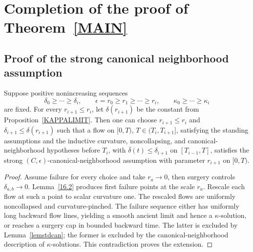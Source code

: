 \chapter{Completion of the proof of Theorem~{\ref{MAIN}}}

\section{Proof of the strong canonical neighborhood assumption}
\label{sectcannbhd}

\begin{proposition}
\label{prop:canonical-neighborhood-extends}

\label{extend}
Suppose positive nonincreasing sequences
\[
  \delta_0\geq\cdots\geq\delta_i,
  \qquad
  \epsilon=r_0\geq r_1\geq\cdots\geq r_i,
  \qquad
  \kappa_0\geq\cdots\geq\kappa_i
\]
are fixed. For every $r_{i+1}\leq r_i$, let $\delta(r_{i+1})$ be the constant
from Proposition~\ref{KAPPALIMIT}. Then one can choose
$r_{i+1}\leq r_i$ and $\delta_{i+1}\leq\delta(r_{i+1})$ such that a flow on
$[0,T)$, $T\in(T_i,T_{i+1}]$, satisfying the standing assumptions and the
inductive curvature, noncollapsing, and canonical-neighborhood hypotheses before
$T_i$, with $\overline\delta(t)\leq\delta_{i+1}$ on
$[T_{i-1},T]$, satisfies the strong $(C,\epsilon)$-canonical-neighborhood
assumption with parameter $r_{i+1}$ on $[0,T)$.
\end{proposition}

\begin{proof}
\sketch

Assume failure for every choice and take $r_a\to0$, then surgery controls
$\delta_{a,b}\to0$. Lemma~\ref{16.2} produces first failure points at the
scale $r_a$. Rescale each flow at such a point to scalar curvature one. The
rescaled flows are uniformly noncollapsed and curvature-pinched. The failure
sequence either has uniformly long backward flow lines, yielding a smooth
ancient limit and hence a $\kappa$-solution, or reaches a surgery cap in bounded
backward time. The latter is excluded by Lemma~\ref{lemstdcan}; the former is
excluded by the canonical-neighborhood description of $\kappa$-solutions. This
contradiction proves the extension.
\end{proof}

